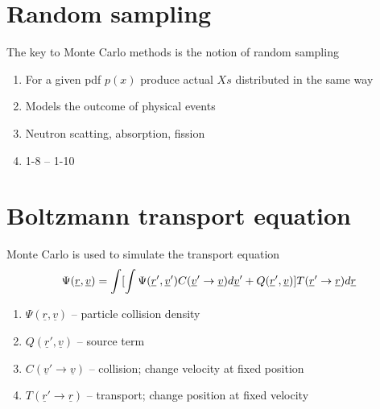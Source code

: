 \documentclass[aspectratio=1610,pdftex,dvipsnames,compress,xcolor={dvipsnames}]{beamer}
\begin{document}
\section{Random sampling}


\addtocounter{framenumber}{-1} 
\begin{frame}{The key to Monte Carlo methods is the notion of random sampling}
    \begin{enumerate}[series=outerlist,topsep=0pt,itemsep=21pt,leftmargin=*,label=(\arabic*)]
        \item[]For a given pdf $p(x)$ produce actual $Xs$ distributed in the same way
        \item[]Models the outcome of physical events
        \item[]Neutron scatting, absorption, fission
        \item[]1-8 -- 1-10
    \end{enumerate}
\end{frame}


\section{Boltzmann transport equation}


\addtocounter{framenumber}{-1} 
\begin{frame}{Monte Carlo is used to simulate the transport equation}
    \begin{equation}
        \Large
        \Psi(\underline{r},\underline{v}) = \int[\int\Psi(\underline{r}', \underline{v}') C(\underline{v}'\rightarrow\underline{v}) d\underline{v}' + Q(\underline{r}',\underline{v})] T(\underline{r}'\rightarrow\underline{r}) d\underline{r}
    \end{equation}

    \vspace*{\fill}

    \begin{enumerate}[series=outerlist,topsep=0pt,itemsep=21pt,leftmargin=*,label=(\arabic*)]
        \item[]$\Psi(\underline{r}, \underline{v})$ -- particle collision density
        \item[]$Q(\underline{r}', \underline{v})$ -- source term
        \item[]$C(\underline{v}' \rightarrow \underline{v})$ -- collision; change velocity at fixed position
        \item[]$T(\underline{r}' \rightarrow \underline{r})$ -- transport; change position at fixed velocity
    \end{enumerate}
\end{frame}
\end{document}
